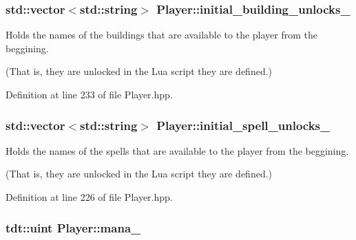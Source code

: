 \subsubsection[{\texorpdfstring{initial\+\_\+building\+\_\+unlocks\+\_\+}{initial_building_unlocks_}}]{\setlength{\rightskip}{0pt plus 5cm}std\+::vector$<$std\+::string$>$ Player\+::initial\+\_\+building\+\_\+unlocks\+\_\+\hspace{0.3cm}{\ttfamily [private]}}\hypertarget{class_player_aeb4a160d13c6aca9c2e25cd76cdda735}{}\label{class_player_aeb4a160d13c6aca9c2e25cd76cdda735}


Holds the names of the buildings that are available to the player from the beggining. 

(That is, they are unlocked in the Lua script they are defined.) 

Definition at line 233 of file Player.\+hpp.

\subsubsection[{\texorpdfstring{initial\+\_\+spell\+\_\+unlocks\+\_\+}{initial_spell_unlocks_}}]{\setlength{\rightskip}{0pt plus 5cm}std\+::vector$<$std\+::string$>$ Player\+::initial\+\_\+spell\+\_\+unlocks\+\_\+\hspace{0.3cm}{\ttfamily [private]}}\hypertarget{class_player_a033fee5620fae5422d74ed491c02cf12}{}\label{class_player_a033fee5620fae5422d74ed491c02cf12}


Holds the names of the spells that are available to the player from the beggining. 

(That is, they are unlocked in the Lua script they are defined.) 

Definition at line 226 of file Player.\+hpp.

\subsubsection[{\texorpdfstring{mana\+\_\+}{mana_}}]{\setlength{\rightskip}{0pt plus 5cm}tdt\+::uint Player\+::mana\+\_\+\hspace{0.3cm}{\ttfamily [private]}}\hypertarget{class_player_aa59cef1b9d820c0236dae21c3515e403}{}\label{class_player_aa59cef1b9d820c0236dae21c3515e403}


